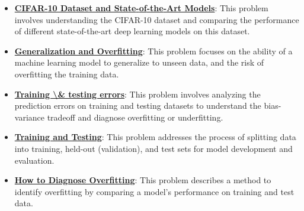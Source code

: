 \documentclass{article}%
\begin{document}
\begin{itemize}[leftmargin=*]
\item \href{https://purdue.brightspace.com/d2l/common/assets/pdfjs-d2l-dist/1.0.14-legacy/web/viewer.html?file=\%2Fcontent\%2Fenforced\%2F1095467-wl.202510.CS.24300.001\%2F09L1-cnn.pdf\%3Fou\%3D1095467\&lang=en-us\&container=d2l-fileviewer-rendered-pdf\&fullscreen=d2l-fileviewer-rendered-pdf-dialog\&height=667#page=23}{\textbf{CIFAR{-}10 Dataset and State{-}of{-}the{-}Art Models}}: This problem involves understanding the CIFAR-10 dataset and comparing the performance of different state-of-the-art deep learning models on this dataset.%
\end{itemize}%
\begin{itemize}[leftmargin=*]%
\item \href{https://purdue.brightspace.com/d2l/common/assets/pdfjs-d2l-dist/1.0.14-legacy/web/viewer.html?file=\%2Fcontent\%2Fenforced\%2F1095467-wl.202510.CS.24300.001\%2F10L1-CrossValidation.pdf\%3Fou\%3D1095467\&lang=en-us\&container=d2l-fileviewer-rendered-pdf\&fullscreen=d2l-fileviewer-rendered-pdf-dialog\&height=667#page=2}{\textbf{Generalization and Overfitting}}: This problem focuses on the ability of a machine learning model to generalize to unseen data, and the risk of overfitting the training data.%
\item \href{https://purdue.brightspace.com/d2l/common/assets/pdfjs-d2l-dist/1.0.14-legacy/web/viewer.html?file=\%2Fcontent\%2Fenforced\%2F1095467-wl.202510.CS.24300.001\%2F10L1-CrossValidation.pdf\%3Fou\%3D1095467\&lang=en-us\&container=d2l-fileviewer-rendered-pdf\&fullscreen=d2l-fileviewer-rendered-pdf-dialog\&height=667#page=4}{\textbf{Training \textbackslash{}\& testing errors}}: This problem involves analyzing the prediction errors on training and testing datasets to understand the bias-variance tradeoff and diagnose overfitting or underfitting.%
\item \href{https://purdue.brightspace.com/d2l/common/assets/pdfjs-d2l-dist/1.0.14-legacy/web/viewer.html?file=\%2Fcontent\%2Fenforced\%2F1095467-wl.202510.CS.24300.001\%2F10L1-CrossValidation.pdf\%3Fou\%3D1095467\&lang=en-us\&container=d2l-fileviewer-rendered-pdf\&fullscreen=d2l-fileviewer-rendered-pdf-dialog\&height=667#page=5}{\textbf{Training and Testing}}: This problem addresses the process of splitting data into training, held-out (validation), and test sets for model development and evaluation.%
\item \href{https://purdue.brightspace.com/d2l/common/assets/pdfjs-d2l-dist/1.0.14-legacy/web/viewer.html?file=\%2Fcontent\%2Fenforced\%2F1095467-wl.202510.CS.24300.001\%2F10L1-CrossValidation.pdf\%3Fou\%3D1095467\&lang=en-us\&container=d2l-fileviewer-rendered-pdf\&fullscreen=d2l-fileviewer-rendered-pdf-dialog\&height=667#page=12}{\textbf{How to Diagnose Overfitting}}: This problem describes a method to identify overfitting by comparing a model's performance on training and test data.%

\end{itemize}
\end{document}
